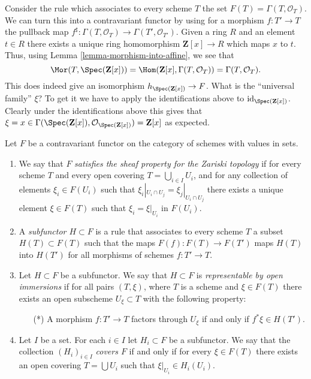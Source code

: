 \begin{example}
\label{example-global-sections}
Consider the rule which associates to every scheme $T$ the set
$F(T) = \Gamma(T, \mathcal{O}_T)$. We can turn this into a contravariant
functor by using for a morphism $f : T' \to T$ the pullback map
$f^\sharp : \Gamma(T, \mathcal{O}_T) \to \Gamma(T', \mathcal{O}_{T'})$.
Given a ring $R$ and an element $t \in R$ there exists a unique
ring homomorphism $\mathbf{Z}[x] \to R$ which maps $x$ to $t$.
Thus, using Lemma \ref{lemma-morphism-into-affine}, we see that
$$
\Mor(T, \Spec(\mathbf{Z}[x])) =
\Hom(\mathbf{Z}[x], \Gamma(T, \mathcal{O}_T)) =
\Gamma(T, \mathcal{O}_T).
$$
This does indeed
give an isomorphism $h_{\Spec(\mathbf{Z}[x])} \to F$.
What is the ``universal family'' $\xi$? To get it we have to
apply the identifications above to $\text{id}_{\Spec(\mathbf{Z}[x])}$.
Clearly under the identifications above this gives
that
$\xi = x \in \Gamma(\Spec(\mathbf{Z}[x]),
\mathcal{O}_{\Spec(\mathbf{Z}[x])}) = \mathbf{Z}[x]$
as expected.
\end{example}

\begin{definition}
\label{definition-representable-by-open-immersions}
Let $F$ be a contravariant functor on the category
of schemes with values in sets.
\begin{enumerate}
\item We say that $F$ {\it satisfies the sheaf property for the
Zariski topology} if for every scheme $T$ and every open covering
$T = \bigcup_{i \in I} U_i$, and for any collection of elements
$\xi_i \in F(U_i)$ such that $\xi_i|_{U_i \cap U_j} =
\xi_j|_{U_i \cap U_j}$ there exists a unique element
$\xi \in F(T)$ such that $\xi_i = \xi|_{U_i}$ in $F(U_i)$.
\item A {\it subfunctor $H \subset F$} is a rule that associates
to every scheme $T$ a subset $H(T) \subset F(T)$ such that
the maps $F(f) : F(T) \to F(T')$ maps $H(T)$ into
$H(T')$ for all morphisms of schemes $f : T' \to T$.
\item Let $H \subset F$ be a subfunctor. We say that
$H \subset F$ is {\it representable by open immersions}
if for all pairs $(T, \xi)$, where $T$ is a scheme and $\xi \in F(T)$
there exists an open subscheme $U_\xi \subset T$ with the following
property:
\begin{itemize}
\item[(*)] A morphism $f : T' \to T$ factors through $U_\xi$ if and only
if $f^*\xi \in H(T')$.
\end{itemize}
\item Let $I$ be a set. For each $i \in I$ let $H_i \subset F$
be a subfunctor. We say that the collection $(H_i)_{i \in I}$
{\it covers $F$} if and only if for every $\xi \in F(T)$
there exists an open covering $T = \bigcup U_i$ such that
$\xi|_{U_i} \in H_i(U_i)$.
\end{enumerate}
\end{definition}

